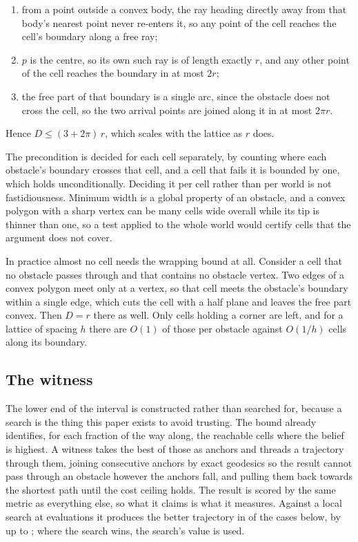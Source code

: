 \documentclass[journal]{IEEEtran}
\begin{document}
\begin{enumerate}
\item from a point outside a convex body, the ray heading directly away from
      that body's nearest point never re-enters it, so any point of the cell
      reaches the cell's boundary along a free ray;
\item $p$ is the centre, so its own such ray is of length exactly $r$, and any
      other point of the cell reaches the boundary in at most $2r$;
\item the free part of that boundary is a single arc, since the obstacle does
      not cross the cell, so the two arrival points are joined along it in at
      most $2\pi r$.
\end{enumerate}

\noindent Hence $D \le (3 + 2\pi)\,r$, which scales with the lattice as $r$
does.

The precondition is decided for each cell separately, by counting where each
obstacle's boundary crosses that cell, and a cell that fails it is bounded by
one, which holds unconditionally. Deciding it per cell rather than per world is
not fastidiousness. Minimum width is a global property of an obstacle, and a
convex polygon with a sharp vertex can be many cells wide overall while its tip
is thinner than one, so a test applied to the whole world would certify cells
that the argument does not cover.

In practice almost no cell needs the wrapping bound at all. Consider a cell
that no obstacle passes through and that contains no obstacle vertex. Two
edges of a convex polygon meet only at a vertex, so that cell meets the
obstacle's boundary within a single edge, which cuts the cell with a half
plane and leaves the free part convex. Then $D = r$ there as well. Only cells
holding a corner are left, and for a lattice of spacing $h$ there are $O(1)$
of those per obstacle against $O(1/h)$ cells along its boundary.

\subsection{The witness}

The lower end of the interval is constructed rather than searched for, because
a search is the thing this paper exists to avoid trusting. The bound already
identifies, for each fraction of the way along, the reachable cells where the
belief is highest. A witness takes the best of those as anchors and threads a
trajectory through them, joining consecutive anchors by exact geodesics so the
result cannot pass through an obstacle however the anchors fall, and pulling
them back towards the shortest path until the cost ceiling holds. The result
is scored by the same metric as everything else, so what it claims is what it
measures. Against a local search at \searchBudget{} evaluations it produces
the better trajectory in \witnessWins{} of the \suitePairs{} cases below, by
up to \witnessBestMargin{}; where the search wins, the search's value is used.
\end{document}
